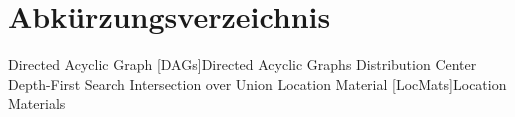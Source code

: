 \chapter*{Abkürzungsverzeichnis}

\begin{acronym}[WYSISWG] %


	 {Directed Acyclic Graph}
	[DAGs]{Directed Acyclic Graphs}
	 {Distribution Center}
	 {Depth-First Search}
	 {Intersection over Union}
	 {Location Material}
	[LocMats]{Location Materials}

\end{acronym}
